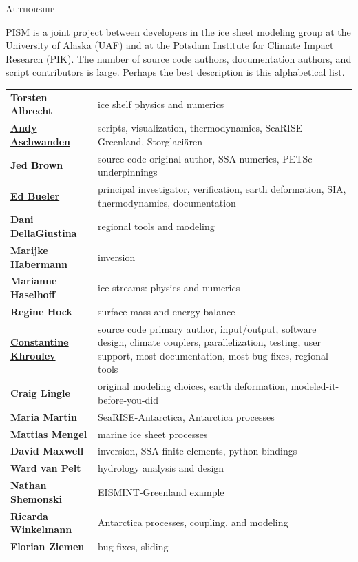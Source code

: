 \documentclass[titlepage,letterpaper,final]{scrartcl}
\begin{document}
\centerline{\textsc{Authorship}}
\bigskip

\normalspacing
PISM is a joint project between developers in the ice sheet modeling group at the University of Alaska (UAF) and at the Potsdam Institute for Climate Impact Research (PIK).  The number of source code authors, documentation authors, and script contributors is large. Perhaps the best description is this alphabetical list.
\bigskip
\normalspacing

\renewcommand{\arraystretch}{1.3}
\begin{tabular}{ll}
\textbf{Torsten Albrecht} & ice shelf physics and numerics \\
\textbf{\underline{Andy Aschwanden}} & \begin{minipage}[t]{4in} scripts, visualization, thermodynamics, SeaRISE-Greenland, Storglaci\"aren  \end{minipage}  \\
\textbf{Jed Brown} & source code original author, SSA numerics, PETSc underpinnings \\
\textbf{\underline{Ed Bueler}} & \begin{minipage}[t]{4in} principal investigator, verification, earth deformation, SIA, thermodynamics, documentation  \end{minipage} \\
\textbf{Dani DellaGiustina} & regional tools and modeling \\
\textbf{Marijke Habermann} & inversion\\
\textbf{Marianne Haselhoff} & ice streams: physics and numerics\\
\textbf{Regine Hock} & surface mass and energy balance \\
\textbf{\underline{Constantine Khroulev}} & \begin{minipage}[t]{4in} source code primary author, input/output, software design, climate couplers, parallelization, testing, user support, most documentation, most bug fixes, regional tools \end{minipage} \\
\textbf{Craig Lingle}\index{People!Lingle, Craig} & original modeling choices, earth deformation, modeled-it-before-you-did \\
\textbf{Maria Martin} & SeaRISE-Antarctica, Antarctica processes \\
\textbf{Mattias Mengel} & marine ice sheet processes \\
\textbf{David Maxwell} & inversion, SSA finite elements, python bindings \\
\textbf{Ward van Pelt} & hydrology analysis and design \\
\textbf{Nathan Shemonski} & EISMINT-Greenland example \\
\textbf{Ricarda Winkelmann} & Antarctica processes, coupling, and modeling  \\
\textbf{Florian Ziemen} & bug fixes, sliding \\
\end{tabular}
\end{document}
